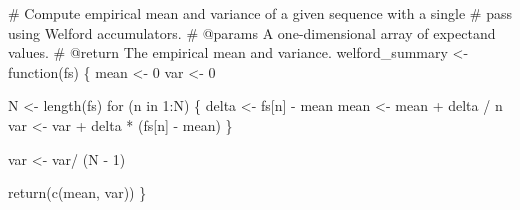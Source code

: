 \documentclass[
  letterpaper,
  DIV=11,
  numbers=noendperiod]{scrartcl}
\newenvironment{Shaded}{\begin{snugshade}}{\end{snugshade}}
\newcommand{\CommentTok}[1]{\textcolor[rgb]{0.37,0.37,0.37}{#1}}
\newcommand{\ControlFlowTok}[1]{\textcolor[rgb]{0.00,0.23,0.31}{#1}}
\newcommand{\DecValTok}[1]{\textcolor[rgb]{0.68,0.00,0.00}{#1}}
\newcommand{\KeywordTok}[1]{\textcolor[rgb]{0.00,0.23,0.31}{#1}}
\newcommand{\NormalTok}[1]{\textcolor[rgb]{0.00,0.23,0.31}{#1}}
\newcommand{\OperatorTok}[1]{\textcolor[rgb]{0.37,0.37,0.37}{#1}}
\begin{document}
\begin{Shaded}
\begin{Highlighting}[]
\CommentTok{\# Compute empirical mean and variance of a given sequence with a single}
\CommentTok{\# pass using Welford accumulators.}
\CommentTok{\# @params A one{-}dimensional array of expectand values.}
\CommentTok{\# @return The empirical mean and variance.}
\NormalTok{welford\_summary }\OperatorTok{\textless{}{-}}\NormalTok{ function(fs) \{}
\NormalTok{  mean }\OperatorTok{\textless{}{-}} \DecValTok{0}
\NormalTok{  var }\OperatorTok{\textless{}{-}} \DecValTok{0}

\NormalTok{  N }\OperatorTok{\textless{}{-}}\NormalTok{ length(fs)}
  \ControlFlowTok{for}\NormalTok{ (n }\KeywordTok{in} \DecValTok{1}\NormalTok{:N) \{}
\NormalTok{    delta }\OperatorTok{\textless{}{-}}\NormalTok{ fs[n] }\OperatorTok{{-}}\NormalTok{ mean}
\NormalTok{    mean }\OperatorTok{\textless{}{-}}\NormalTok{ mean }\OperatorTok{+}\NormalTok{ delta }\OperatorTok{/}\NormalTok{ n}
\NormalTok{    var }\OperatorTok{\textless{}{-}}\NormalTok{ var }\OperatorTok{+}\NormalTok{ delta }\OperatorTok{*}\NormalTok{ (fs[n] }\OperatorTok{{-}}\NormalTok{ mean)}
\NormalTok{  \}}

\NormalTok{  var }\OperatorTok{\textless{}{-}}\NormalTok{ var}\OperatorTok{/}\NormalTok{ (N }\OperatorTok{{-}} \DecValTok{1}\NormalTok{)}

  \ControlFlowTok{return}\NormalTok{(c(mean, var))}
\NormalTok{\}}
\end{Highlighting}
\end{Shaded}
\end{document}
